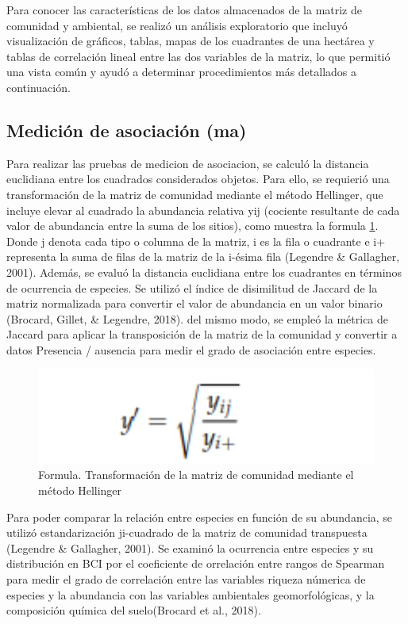\documentclass[11pt,]{article}
\begin{document}
Para conocer las características de los datos almacenados de la matriz
de comunidad y ambiental, se realizó un análisis exploratorio que
incluyó visualización de gráficos, tablas, mapas de los cuadrantes de
una hectárea y tablas de correlación lineal entre las dos variables de
la matriz, lo que permitió una vista común y ayudó a determinar
procedimientos más detallados a continuación.

\subsection{Medición de asociación
(ma)}\label{mediciuxf3n-de-asociaciuxf3n-ma}

Para realizar las pruebas de medicion de asociacion, se calculó la
distancia euclidiana entre los cuadrados considerados objetos. Para
ello, se requierió una transformación de la matriz de comunidad mediante
el método Hellinger, que incluye elevar al cuadrado la abundancia
relativa yij (cociente resultante de cada valor de abundancia entre la
suma de los sitios), como muestra la formula \ref{fig:formula}. Donde j
denota cada tipo o columna de la matriz, i es la fila o cuadrante e i+
representa la suma de filas de la matriz de la i-ésima fila (Legendre \&
Gallagher, 2001). Además, se evaluó la distancia euclidiana entre los
cuadrantes en términos de ocurrencia de especies. Se utilizó el índice
de disimilitud de Jaccard de la matriz normalizada para convertir el
valor de abundancia en un valor binario (Brocard, Gillet, \& Legendre,
2018). del mismo modo, se empleó la métrica de Jaccard para aplicar la
transposición de la matriz de la comunidad y convertir a datos Presencia
/ ausencia para medir el grado de asociación entre especies.

\begin{figure}
\centering
\includegraphics[width=1.00000\textwidth]{Formula2.png}
\caption{Formula. Transformación de la matriz de comunidad mediante el
método Hellinger \label{fig:formula}}
\end{figure}

Para poder comparar la relación entre especies en función de su
abundancia, se utilizó estandarización ji-cuadrado de la matriz de
comunidad transpuesta (Legendre \& Gallagher, 2001). Se examinó la
ocurrencia entre especies y su distribución en BCI por el coeficiente de
orrelación entre rangos de Spearman para medir el grado de correlación
entre las variables riqueza númerica de especies y la abundancia con las
variables ambientales geomorfológicas, y la composición química del
suelo(Brocard et al., 2018).
\end{document}
